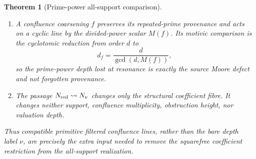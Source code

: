 \documentclass[11pt]{article}
\newtheorem{theorem}{Theorem}[section]
\theoremstyle{remark}
\newcommand{\Mot}{\mathrm{Mot}}
\newcommand{\MR}{\mathrm{MR}}
\begin{document}
\begin{theorem}[Prime-power all-support comparison]
\begin{enumerate}[label=\textup{(\roman*)}]
\[\begin{CD}
      \mathscr M_{S,N_\mu}^{\Mot,\MR}.
      \end{CD}
      \]
      For \(\mu=\nu^{\rm sf}\), the lower row is the Layer-I squarefree
      realization after the fixed pointed identification.
\item A confluence coarsening \(f\) preserves its repeated-prime provenance
      and acts on a cyclic line by the divided-power scalar \(M(f)\).  Its
      motivic comparison is the cyclotomic reduction from order \(d\) to
      \[
       d_f=\frac{d}{\gcd(d,M(f))},
      \]
      so the prime-power depth lost at resonance is exactly the source Moore
      defect and not forgotten provenance.
\item The passage \(N_{\rm red}\leadsto N_\nu\) changes only the structural
      coefficient fibre.  It changes neither support, confluence multiplicity,
      obstruction height, nor valuation depth.
\end{enumerate}
Thus compatible primitive filtered confluence lines, rather than the bare
depth label \(\nu\), are precisely the extra input needed to remove the
squarefree coefficient restriction from the all-support realization.
\end{theorem}
\end{document}
